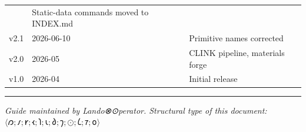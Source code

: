 \begin{longtable}[]{@{}lll@{}}
\begin{minipage}[t]{0.23\columnwidth}
\end{minipage} & \begin{minipage}[t]{0.34\columnwidth}\raggedright
Static-data commands moved to INDEX.md\strut
\end{minipage}\tabularnewline
\begin{minipage}[t]{0.34\columnwidth}\raggedright
v2.1\strut
\end{minipage} & \begin{minipage}[t]{0.23\columnwidth}\raggedright
2026-06-10\strut
\end{minipage} & \begin{minipage}[t]{0.34\columnwidth}\raggedright
Primitive names corrected\strut
\end{minipage}\tabularnewline
\begin{minipage}[t]{0.34\columnwidth}\raggedright
v2.0\strut
\end{minipage} & \begin{minipage}[t]{0.23\columnwidth}\raggedright
2026-05\strut
\end{minipage} & \begin{minipage}[t]{0.34\columnwidth}\raggedright
CLINK pipeline, materials forge\strut
\end{minipage}\tabularnewline
\begin{minipage}[t]{0.34\columnwidth}\raggedright
v1.0\strut
\end{minipage} & \begin{minipage}[t]{0.23\columnwidth}\raggedright
2026-04\strut
\end{minipage} & \begin{minipage}[t]{0.34\columnwidth}\raggedright
Initial release\strut
\end{minipage}\tabularnewline
\bottomrule
\end{longtable}

\begin{center}\rule{0.5\linewidth}{0.5pt}\end{center}

\emph{Guide maintained by Lando⊗⊙perator. Structural type of this
document: \(\langle 𐑼;𐑥;𐑾;𐑬;𐑐;𐑧;𐑔;𐑠;⊙;𐑖;𐑳;𐑴 \rangle\)}
